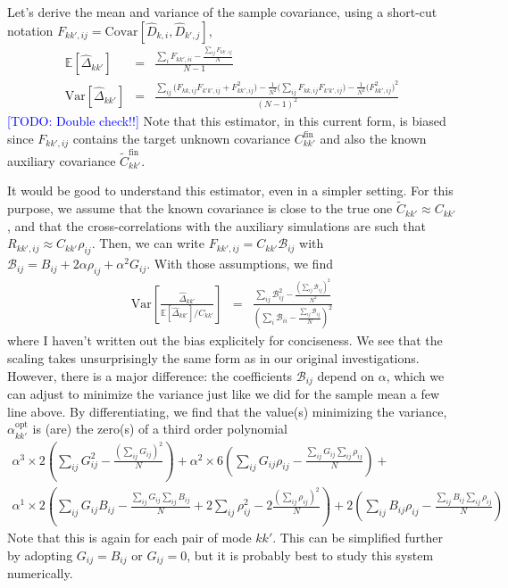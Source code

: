 \documentclass{aastex6}
\newcommand{\eqn}[1]{\begin{eqnarray}#1\end{eqnarray}}
\newcommand{\todo}[1]{\textcolor{blue}{[TODO: #1]}}
\begin{document}
Let's derive the mean and variance of the sample covariance, using a short-cut notation $F_{kk',ij} = \mathrm{Covar}[\hat{D}_{k, i}, \hat{D}_{k', j}]$,
\eqn{
	\mathbb{E}[\hat{\Delta}_{kk'}] &=&  \frac{ \sum_{i}F_{kk',ii} - \frac{\sum_{ij} F_{kk',ij}}{N} } {N-1}	 \\	
	 \mathrm{Var}\left[ \hat{\Delta}_{kk'}\right]  &=&	\frac{\sum_{ij} \bigl(F_{kk,ij}F_{k'k',ij} + F_{kk',ij}^2 \bigr) - \frac{1}{N^2}\bigl( \sum_{ij}F_{kk,ij}F_{k'k',ij}\bigr) - \frac{1}{N^2}\bigl(  F^2_{kk',ij} \bigr)^2 }{(N-1)^2}	
	}
	\todo{Double check!!}
	Note that this estimator, in this current form, is biased since  $F_{kk',ij}$ contains the target unknown covariance ${C}_{kk'}^\mathrm{fin}$ and also the known auxiliary covariance $\tilde{C}_{kk'}^\mathrm{fin}$.
	
It would be good to understand this estimator, even in a simpler setting. For this purpose, we assume that the known covariance is close to the true one $\tilde{C}_{kk'} \approx {C}_{kk'}$, and that the cross-correlations with the auxiliary simulations are such that $R_{kk',ij} \approx {C}_{kk'} \rho_{ij}$.
Then, we can write $F_{kk',ij} ={C}_{kk'}  \mathcal{B}_{ij}$ with $\mathcal{B}_{ij} = B_{ij} + 2 \alpha \rho_{ij} + \alpha^2 G_{ij}$. 
With those assumptions, we find
\eqn{
	 \mathrm{Var}\left[ \frac{\hat{\Delta}_{kk'}}{\mathbb{E}[\hat{\Delta}_{kk'}] /{C}_{kk'} }\right]  &=&  \frac{ \sum_{ij} \mathcal{B}_{ij}^2  - \frac{\left(\sum_{ij}\mathcal{B}_{ij}\right)^2}{N^2}}{ \left(\sum_i \mathcal{B}_{ii} - \frac{\sum_{ij}\mathcal{B}_{ij}}{N}\right)^2 }
	}
where I haven't written out the bias explicitely for conciseness. 	
We see that the scaling takes unsurprisingly the same form as in our original investigations. However, there is a major difference: the coefficients $\mathcal{B}_{ij}$ depend on $\alpha$, which we can adjust to minimize the variance just like we did for the sample mean a few line above.
By differentiating, we find that the value(s) minimizing the variance, ${\alpha^\mathrm{opt}_{kk'}}$ is (are) the zero(s) of a third order polynomial
\eqn{
	 \alpha^3  \times 2 \left(  \sum_{ij} G_{ij}^2 - \frac{(\sum_{ij} G_{ij})^2}{N}\right) + 
	  \alpha^2 \times 6 \left(  \sum_{ij} G_{ij} \rho_{ij} - \frac{\sum_{ij} G_{ij} \sum_{ij} \rho_{ij}}{N} \right) + \\ 
	  \alpha^1 \times 2 \left(  \sum_{ij} G_{ij} B_{ij} - \frac{\sum_{ij} G_{ij} \sum_{ij} B_{ij}}{N}  + 2 \sum_{ij} \rho^2_{ij} - 2\frac{(\sum_{ij}  \rho_{ij})^2}{N}  \right) + 
	    2 \left(  \sum_{ij} B_{ij} \rho_{ij} - \frac{\sum_{ij} B_{ij} \sum_{ij} \rho_{ij}}{N}  \right)
}
Note that this is again for each pair of mode $kk'$. 
This can be simplified further by adopting $G_{ij}=B_{ij}$ or $G_{ij} = 0$, but it is probably best to study this system numerically.
\end{document}
